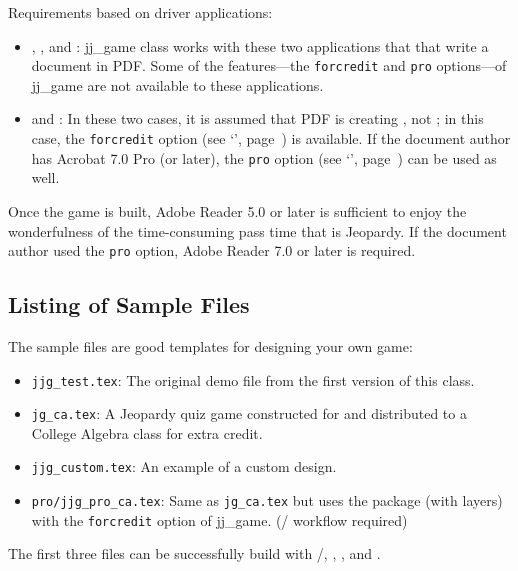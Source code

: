 \documentclass{article}
\def\jj{\textsf{jj\_game}}
\begin{document}
\newtopic\noindent
Requirements based on driver applications:
\begin{itemize}

\item {}, , and : {\jj} class works
    with these two applications that that write a document in PDF. Some of
    the features---the \texttt{forcredit} and \texttt{pro} options---of
    {\jj} are not available to these applications.

\item {} and : In these two cases, it is assumed that PDF is
creating , not ; in this case, the
\texttt{forcredit} option (see `',
page~\pageref*{forcreditOption}) is available.  If the document author has
Acrobat 7.0 Pro (or later), the \texttt{pro} option (see
`', page~\pageref*{proOption}) can be used as
well.

\end{itemize}
Once the game is built, Adobe Reader 5.0 or later is sufficient to
enjoy the wonderfulness of the time-consuming pass time that is
Jeopardy. If the document author used the \texttt{pro} option, Adobe
Reader 7.0 or later is required.


\subsection{Listing of Sample Files}

The sample files are good templates for designing your own game:
\begin{itemize}
    \item \texttt{jjg\_test.tex}: The original demo file from the first version
    of this class.
    \item \texttt{jg\_ca.tex}: A Jeopardy quiz game constructed for and distributed
    to a College Algebra class for extra credit.
    \item \texttt{jjg\_custom.tex}: An example of a custom design.
    \item \texttt{pro/jjg\_pro\_ca.tex}: Same as \texttt{jg\_ca.tex} but uses the 
    package (with layers) with the \texttt{forcredit} option of \jj. (/ workflow required)
\end{itemize}
The first three files can be successfully build with
/, , , and .
\end{document}
